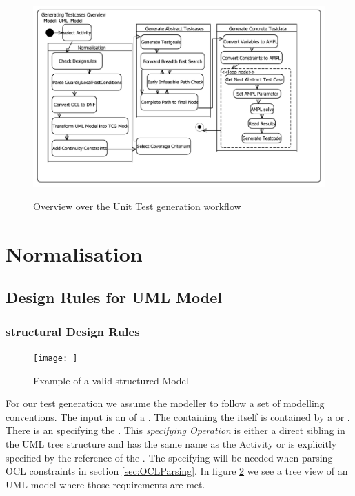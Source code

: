 \begin{figure}
\includegraphics[width=\textwidth]{pics/workflow.pdf}
\label{fig:workflowOverview}
\caption{Overview over the Unit Test generation workflow}
\end{figure}
\section{Normalisation}
\label{sec:Normalisation}
\subsection{Design Rules for UML Model} %
\subsubsection{structural Design Rules}
\begin{figure}
\label{fig:StructureExample}
\texttt{[image: ]}
\caption{Example of a valid structured Model}
\end{figure}
For our test generation we assume the modeller to follow a set of modelling conventions. The input  is an  of a . The   containing the  itself is contained by a  or . There is an  specifying the . This \emph{specifying Operation} is either a direct sibling in the UML tree structure and has the same name as the Activity or is explicitly specified by the  reference of the . The specifying  will be needed when parsing OCL constraints in section \ref{sec:OCLParsing}. In figure \ref{fig:StructureExample} we see a tree view of an UML model where those requirements are met.
